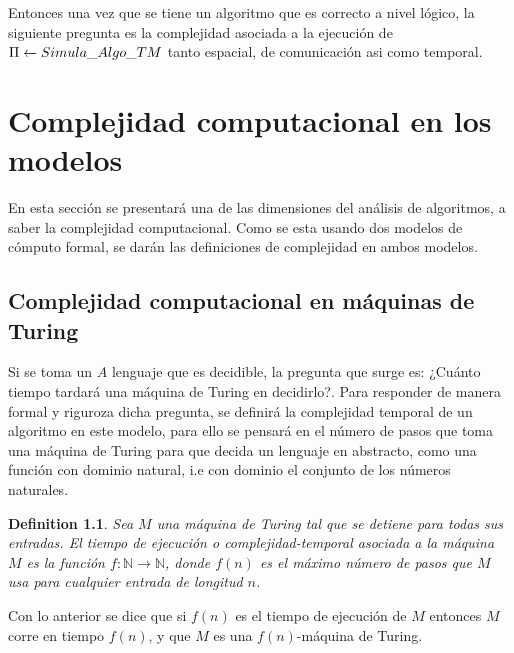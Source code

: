 \documentclass[10pt]{report}
\newtheorem{definition}{Definition}
\begin{document}
    Entonces una vez que se tiene un algoritmo que es correcto a nivel lógico,
    la siguiente pregunta es la complejidad asociada a la ejecución de $\Pi \gets Simula\char95Algo\char95TM$
    tanto espacial, de comunicación asi como temporal.
    \newpage

    \chapter{Complejidad computacional en los modelos}
    En esta sección se presentará una de las dimensiones del análisis de algoritmos, a saber la complejidad computacional.
    Como se esta usando dos modelos de cómputo formal, se darán las definiciones de complejidad en ambos modelos.

    \section{Complejidad computacional en máquinas de Turing}
    Si se toma un $A$ lenguaje que es decidible, la pregunta que surge es: ¿Cuánto tiempo tardará una máquina de Turing
    en decidirlo?.
    Para responder de manera formal y riguroza dicha pregunta, se definirá la complejidad temporal de un algoritmo
    en este modelo, para ello se pensará en el número de pasos que toma una máquina de Turing para que decida un lenguaje
    en abstracto, como una función con dominio natural, i.e con dominio el conjunto de los números naturales.

    \begin{definition}
        Sea $M$ una máquina de Turing tal que se detiene para todas sus entradas.\newline
        El tiempo de ejecución o complejidad-temporal asociada a la máquina $M$ es la función
        $f:\mathbb{N}\rightarrow\mathbb{N} $, donde $f(n)$ es el máximo número de pasos que $M$ usa para cualquier entrada de
        longitud $n$.
    \end{definition}
    Con lo anterior se dice que si $f(n)$ es el tiempo de ejecución de $M$ entonces $M$ corre en tiempo $f(n)$,
    y que $M$ es una $f(n)$-máquina de Turing.
\end{document}
